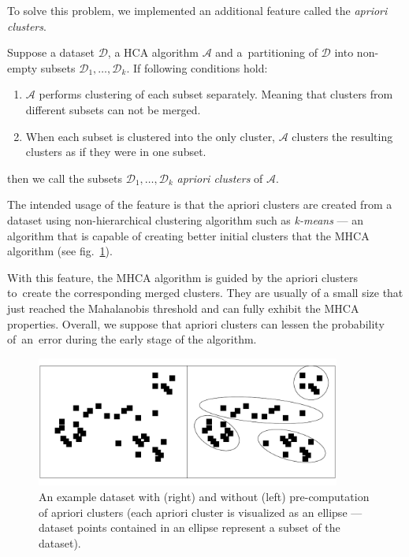 To solve this problem, we implemented an additional feature called the \emph{apriori clusters}. 

\begin{defn}
	Suppose a dataset $\mathcal{D}$, a HCA algorithm $\mathcal{A}$ and a~partitioning of  $\mathcal{D}$ into non-empty subsets $\mathcal{D}_1,\dots,\mathcal{D}_k$. If following conditions hold:
	\begin{enumerate}
		\item $\mathcal{A}$ performs clustering of each subset separately. Meaning that clusters from different subsets can not be merged.
		\item When each subset is clustered into the only cluster, $\mathcal{A}$ clusters the resulting clusters as if they were in one subset.
	\end{enumerate}
	then we call the subsets $\mathcal{D}_1,\dots,\mathcal{D}_k$ \emph{apriori clusters} of $\mathcal{A}$.
	\label{def03:apriori}
\end{defn}

The intended usage of the feature is that the apriori clusters are created from a dataset using non-hierarchical clustering algorithm such as \emph{k-means} --- an algorithm that is capable of creating better initial clusters that the MHCA algorithm (see fig.~\ref{fig03:apr_ex}).

With this feature, the MHCA algorithm is guided by the apriori clusters to~create the corresponding merged clusters. They are usually of a small size that just reached the Mahalanobis threshold and can fully exhibit the MHCA properties. Overall, we suppose that apriori clusters can lessen the probability of~an~error during the early stage of the algorithm.


\begin{figure}\centering
	\includegraphics[width=10cm]{img/apriori_example}
	\caption{An example dataset with (right) and without (left) pre-computation of apriori clusters (each apriori cluster is visualized as an ellipse --- dataset points contained in an ellipse represent a subset of the dataset).}
	\label{fig03:apr_ex}
\end{figure}

